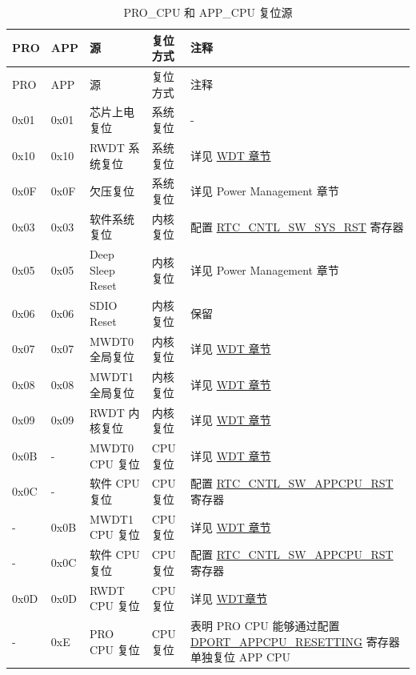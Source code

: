 \documentclass[main\_\_CN.tex]{subfiles}
\begin{document}
\begin{longtable}[c]{ |l|l|l|l|m{8cm}| }
\caption{PRO\_CPU 和 APP\_CPU 复位源}
    \label{table:resetreasons}  \\
        \hline
        \rowcolor{lightgray}
        PRO & APP & 源 & 复位方式 & 注释\\
        \hline
        \endfirsthead
        \hline
       \rowcolor{lightgray}
        PRO & APP &  源 & 复位方式 & 注释 \\
        \hline
        \endhead
        \endfoot
        0x01 & 0x01 & 芯片上电复位 & 系统复位 &  - \\
        \hline
        0x10 & 0x10 & RWDT 系统复位 & 系统复位 & 详见 \hyperref[mod:wdt]{WDT 章节} \\
        \hline
        0x0F & 0x0F & 欠压复位 & 系统复位 & 详见 Power Management 章节\\
        \hline
        0x03 & 0x03 & 软件系统复位 & 内核复位 & 配置 \hyperref[fielddesc:RTCCNTLSWSYSRST]{RTC\_CNTL\_SW\_SYS\_RST} 寄存器\\
        \hline
        0x05 & 0x05 & Deep Sleep Reset & 内核复位 & 详见 Power Management 章节 \\
        \hline
        0x06 & 0x06 & SDIO Reset & 内核复位 & 保留
        \\\hline
        0x07 & 0x07 & MWDT0 全局复位 & 内核复位 & 详见 \hyperref[mod:wdt]{WDT 章节} \\
        \hline
        0x08 & 0x08 & MWDT1 全局复位 & 内核复位 & 详见 \hyperref[mod:wdt]{WDT 章节} \\
        \hline
        0x09 & 0x09 & RWDT 内核复位 & 内核复位 & 详见 \hyperref[mod:wdt]{WDT 章节} \\
        \hline
        0x0B & - & MWDT0 CPU 复位 & CPU 复位 & 详见 \hyperref[mod:wdt]{WDT 章节}  \\
        \hline
        0x0C & - & 软件 CPU 复位 & CPU 复位 &  配置 \hyperref[fielddesc:RTCCNTLSWAPPCPURST]{RTC\_CNTL\_SW\_APPCPU\_RST} 寄存器\\
		\hline
        - & 0x0B & MWDT1 CPU 复位 & CPU 复位 & 详见 \hyperref[mod:wdt]{WDT 章节} \\
        \hline
        - & 0x0C & 软件 CPU 复位 & CPU 复位 &  配置 \hyperref[fielddesc:RTCCNTLSWAPPCPURST]{RTC\_CNTL\_SW\_APPCPU\_RST} 寄存器\\
        \hline
        0x0D & 0x0D & RWDT CPU 复位 & CPU复位 & 详见 \hyperref[mod:wdt]{WDT章节}\\
        \hline
         - &  0xE &  PRO CPU 复位 &  CPU 复位 & 表明 PRO CPU 能够通过配置 \hyperref[DPORTAPPCPURESETTING]{DPORT\_APPCPU\_RESETTING} 寄存器单独复位 APP CPU \\
        \hline
    \end{longtable}
\end{document}
